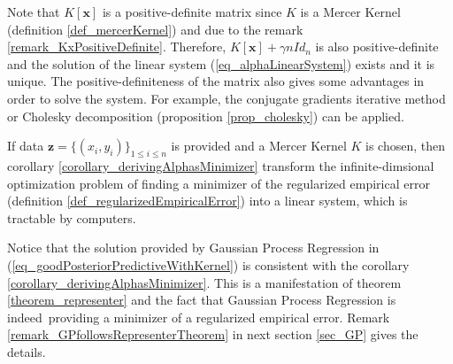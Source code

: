 \begin{remark}
  Note that $K[\pmb{x}]$ is a positive-definite matrix since $K$ is a Mercer Kernel (definition \ref{def_mercerKernel}) and due to the remark \ref{remark_KxPositiveDefinite}. Therefore, $K[\pmb{x}] + \gamma n Id_n$ is also positive-definite and the solution of the linear system (\ref{eq_alphaLinearSystem}) exists and it is unique. The positive-definiteness of the matrix also gives some advantages in order to solve the system. For example, the conjugate gradients iterative method or Cholesky decomposition (proposition \ref{prop_cholesky}) can be applied.
\end{remark}

\begin{remark}
  If data $\pmb{z} = \{(x_i,y_i)\}_{1 \leq i \leq n}$ is provided and a Mercer Kernel $K$ is chosen, then corollary \ref{corollary_derivingAlphasMinimizer} transform the infinite\hyp{}dimsional optimization problem of finding a minimizer of the regularized empirical error (definition \ref{def_regularizedEmpiricalError}) into a linear system, which is tractable by computers.
\end{remark}

\begin{remark} \label{remark_GPconsistentWithRepresenterTheorem}
  Notice that the solution provided by Gaussian Process Regression in (\ref{eq_goodPosteriorPredictiveWithKernel}) is consistent with the corollary \ref{corollary_derivingAlphasMinimizer}. This is a manifestation of theorem \ref{theorem_representer} and the fact that Gaussian Process Regression is indeed providing a minimizer of a regularized empirical error. Remark \ref{remark_GPfollowsRepresenterTheorem} in next section \ref{sec_GP} gives the details.
\end{remark}


